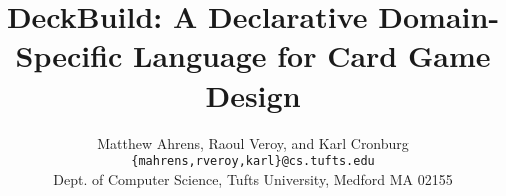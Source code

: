 \documentclass[pldi]{sigplanconf-pldi15}
\begin{document}
%
%

\title{DeckBuild: A Declarative Domain-Specific Language for Card Game Design}

\date{
  Matthew Ahrens, Raoul Veroy, and Karl Cronburg\\
  \texttt{\{mahrens,rveroy,karl\}@cs.tufts.edu}\\
  Dept. of Computer Science, Tufts University, Medford MA 02155\\
}

\maketitle
\begin{abstract}
\end{abstract}






\begin{thebibliography}{}
\softraggedright
\end{thebibliography}


\end{document}
